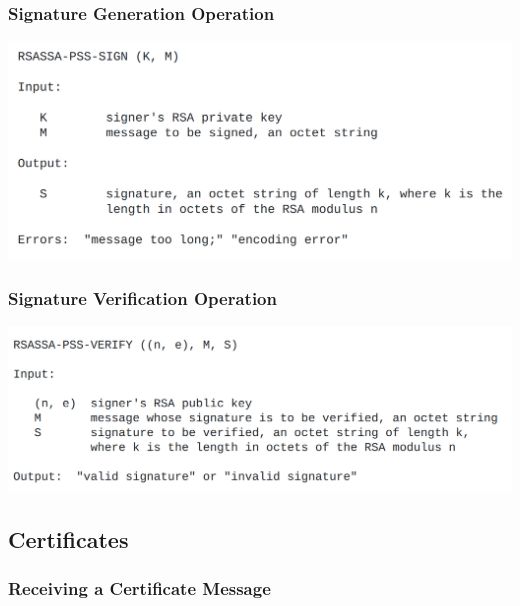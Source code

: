 \documentclass{article}
\begin{document}
\subsubsection{Signature Generation Operation}
\begin{center}
    \includegraphics[width=1.1\columnwidth]{media/RSASSA-SIGN.png}
\end{center}


\subsubsection{Signature Verification Operation}
\begin{center}
    \includegraphics[width=1.1\columnwidth]{media/RSASSA-VERIFY.png}
\end{center}


\subsection{Certificates}


\subsubsection{Receiving a Certificate Message}
\end{document}
